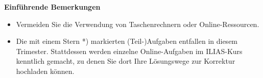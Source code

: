 


\newcommand{\PROFESSOR}{Prof.\ Dr.\ Thomas Carraro}
\newcommand{\ASSISTANT}{\setlength{\tabcolsep}{0pt}\begin{tabular}{l} M.Sc Janna Puderbach\end{tabular}}

\newcommand{\Jahr}{2024}
\newcommand{\Trimester}{WT}
\newcommand{\Kurs}{Mathematik II}
\newcommand{\TYPE}{Aufgabenblatt}
\newcommand{\BLATT}{1}
\newcommand{\TOPIC}{Definitheit, Ähnlichkeit}








% 

\textbf{Einführende Bemerkungen}

\begin{itemize}
\item Vermeiden Sie die Verwendung von Taschenrechnern oder Online-Ressourcen.
\item Die mit einem Stern *) markierten (Teil-)Aufgaben entfallen in diesem Trimester. Stattdessen werden einzelne Online-Aufgaben im ILIAS-Kurs kenntlich gemacht, zu denen Sie dort Ihre L\"osungswege zur Korrektur hochladen k\"onnen. 
\end{itemize}





% 

